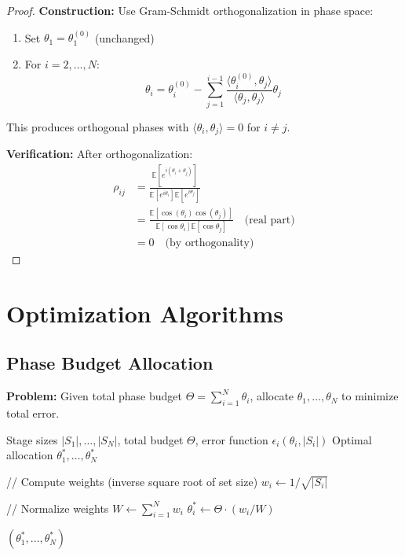 \documentclass[11pt]{article}
\begin{document}
\begin{proof}
\textbf{Construction:} Use Gram-Schmidt orthogonalization in phase space:
\begin{enumerate}
\item Set $\theta_1 = \theta_1^{(0)}$ (unchanged)
\item For $i = 2, \ldots, N$:
\begin{equation}
\theta_i = \theta_i^{(0)} - \sum_{j=1}^{i-1} \frac{\langle \theta_i^{(0)}, \theta_j \rangle}{\langle \theta_j, \theta_j \rangle} \theta_j
\end{equation}
\end{enumerate}

This produces orthogonal phases with $\langle \theta_i, \theta_j \rangle = 0$ for $i \neq j$.

\textbf{Verification:} After orthogonalization:
\begin{align}
\rho_{ij} &= \frac{\mathbb{E}[e^{i(\theta_i + \theta_j)}]}{\mathbb{E}[e^{i\theta_i}] \mathbb{E}[e^{i\theta_j}]} \\
&= \frac{\mathbb{E}[\cos(\theta_i) \cos(\theta_j)]}{\mathbb{E}[\cos\theta_i] \mathbb{E}[\cos\theta_j]} \quad \text{(real part)} \\
&= 0 \quad \text{(by orthogonality)}
\end{align}
\end{proof}

\section{Optimization Algorithms}
\label{sec:optimization}

\subsection{Phase Budget Allocation}

\textbf{Problem:} Given total phase budget $\Theta = \sum_{i=1}^N \theta_i$, allocate $\theta_1, \ldots, \theta_N$ to minimize total error.

\begin{algorithm}
\caption{Optimal Phase Allocation}
\label{alg:phase_allocation}
\begin{algorithmic}[1]
\REQUIRE Stage sizes $|S_1|, \ldots, |S_N|$, total budget $\Theta$, error function $\epsilon_i(\theta_i, |S_i|)$
\ENSURE Optimal allocation $\theta_1^*, \ldots, \theta_N^*$

\STATE // Compute weights (inverse square root of set size)
    \STATE $w_i \leftarrow 1 / \sqrt{|S_i|}$
\ENDFOR

\STATE // Normalize weights
\STATE $W \leftarrow \sum_{i=1}^N w_i$
    \STATE $\theta_i^* \leftarrow \Theta \cdot (w_i / W)$
\ENDFOR

\RETURN $(\theta_1^*, \ldots, \theta_N^*)$
\end{algorithmic}
\end{algorithm}
\end{document}
